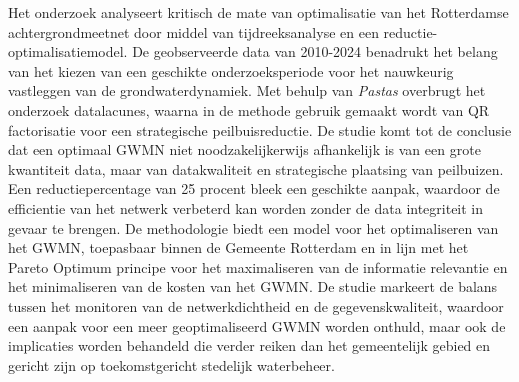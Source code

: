 Het onderzoek analyseert kritisch de mate van optimalisatie van het Rotterdamse achtergrondmeetnet door middel van tijdreeksanalyse en een reductie-optimalisatiemodel. De geobserveerde data van 2010-2024 benadrukt het belang van het kiezen van een geschikte onderzoeksperiode voor het nauwkeurig vastleggen van de grondwaterdynamiek. Met behulp van \textit{Pastas} overbrugt het onderzoek datalacunes, waarna in de methode gebruik gemaakt wordt van QR factorisatie voor een strategische peilbuisreductie. De studie komt tot de conclusie dat een optimaal GWMN niet noodzakelijkerwijs afhankelijk is van een grote kwantiteit data, maar van datakwaliteit en strategische plaatsing van peilbuizen. Een reductiepercentage van 25 procent bleek een geschikte aanpak, waardoor de efficientie van het netwerk verbeterd kan worden zonder de data integriteit in gevaar te brengen. De methodologie biedt een model voor het optimaliseren van het GWMN, toepasbaar binnen de Gemeente Rotterdam en in lijn met het Pareto Optimum principe voor het maximaliseren van de informatie relevantie en het minimaliseren van de kosten van het GWMN. De studie markeert de balans tussen het monitoren van de netwerkdichtheid en de gegevenskwaliteit, waardoor een aanpak voor een meer geoptimaliseerd GWMN worden onthuld, maar ook de implicaties worden behandeld die verder reiken dan het gemeentelijk gebied en gericht zijn op toekomstgericht stedelijk waterbeheer.


